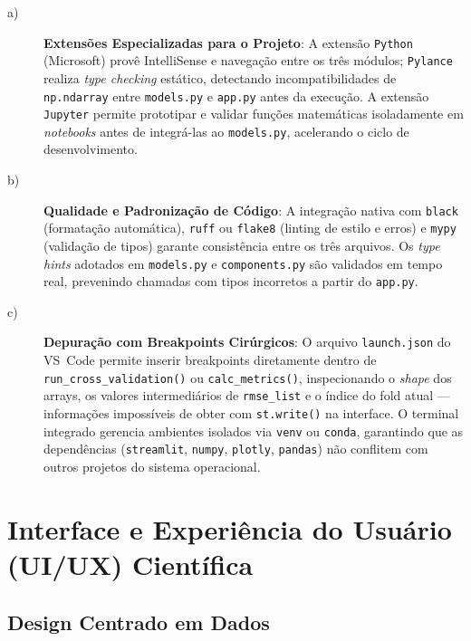 \begin{description}

\item[a)] \textbf{Extensões Especializadas para o Projeto}: A extensão \texttt{Python}
(Microsoft) provê IntelliSense e navegação entre os três módulos; \texttt{Pylance} realiza
\textit{type checking} estático, detectando incompatibilidades de \texttt{np.ndarray}
entre \texttt{models.py} e \texttt{app.py} antes da execução. A extensão
\texttt{Jupyter} permite prototipar e validar funções matemáticas isoladamente em
\textit{notebooks} antes de integrá-las ao \texttt{models.py}, acelerando o ciclo de
desenvolvimento.

\item[b)] \textbf{Qualidade e Padronização de Código}: A integração nativa com
\texttt{black} (formatação automática), \texttt{ruff} ou \texttt{flake8} (linting de
estilo e erros) e \texttt{mypy} (validação de tipos) garante consistência entre os três
arquivos. Os \textit{type hints} adotados em \texttt{models.py} e \texttt{components.py}
são validados em tempo real, prevenindo chamadas com tipos incorretos a partir do
\texttt{app.py}.

\item[c)] \textbf{Depuração com Breakpoints Cirúrgicos}: O arquivo \texttt{launch.json}
do VS~Code permite inserir breakpoints diretamente dentro de
\texttt{run\_cross\_validation()} ou \texttt{calc\_metrics()}, inspecionando o
\textit{shape} dos arrays, os valores intermediários de \texttt{rmse\_list} e o índice
do fold atual — informações impossíveis de obter com \texttt{st.write()} na interface.
O terminal integrado gerencia ambientes isolados via \texttt{venv} ou \texttt{conda},
garantindo que as dependências (\texttt{streamlit}, \texttt{numpy}, \texttt{plotly},
\texttt{pandas}) não conflitem com outros projetos do sistema operacional.

\end{description}


\chapter{Interface e Experiência do Usuário (UI/UX) Científica}

\section{Design Centrado em Dados}


